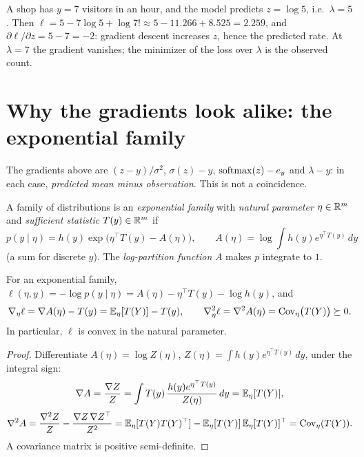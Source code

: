 \begin{notechapter}
\begin{example}\label{output-distributions:ex:poisson}
A shop has $y = 7$ visitors in an hour, and the model predicts $z = \log5$, i.e.\
$\lambda = 5$. Then $\ell = 5 - 7\log5 + \log7!\approx5 - 11.266 + 8.525 = 2.259$, and
$\partial\ell/\partial z = 5 - 7 = -2$: gradient descent increases $z$, hence the predicted rate. At
$\lambda = 7$ the gradient vanishes; the minimizer of the loss over $\lambda$ is the observed
count.
\end{example}

\section{Why the gradients look alike: the exponential family}\label{output-distributions:sec:expfam}

The gradients above are $(z - y)/\sigma^2$, $\sigma(z) - y$, $\operatorname{softmax}(z) - e_y$ and $\lambda - y$: in
each case, \emph{predicted mean minus observation}. This is not a coincidence.

\begin{definition}\label{output-distributions:def:expfam}
A family of distributions is an \emph{exponential family} with \emph{natural
parameter} $\eta\in\mathbb{R}^m$ and \emph{sufficient statistic} $T(y)\in\mathbb{R}^m$ if
\[
  p(y\mid\eta) = h(y)\exp\bigl(\eta^\top T(y) - A(\eta)\bigr),\qquad
  A(\eta) = \log\int h(y)e^{\eta^\top T(y)}\,dy
\]
(a sum for discrete $y$). The \emph{log-partition function} $A$ makes $p$ integrate
to $1$.
\end{definition}

\begin{proposition}\label{output-distributions:prop:expfam}
For an exponential family, $\ell(\eta, y) = -\log p(y\mid\eta) = A(\eta) - \eta^\top T(y) - \log h(y)$, and
\[
  \nabla_\eta\ell = \nabla A(\eta) - T(y) = \mathbb{E}_\eta[T(Y)] - T(y),\qquad
  \nabla^2_\eta\ell = \nabla^2A(\eta) = \operatorname{Cov}_\eta\bigl(T(Y)\bigr)\succeq0 .
\]
In particular, $\ell$ is convex in the natural parameter.
\end{proposition}

\begin{proof}
Differentiate $A(\eta) = \log Z(\eta)$, $Z(\eta) = \int h(y)e^{\eta^\top T(y)}\,dy$, under the integral sign:
\[
  \nabla A = \frac{\nabla Z}{Z} = \int T(y)\,\frac{h(y)e^{\eta^\top T(y)}}{Z(\eta)}\,dy = \mathbb{E}_\eta[T(Y)],
\]
\[
  \nabla^2A = \frac{\nabla^2Z}Z - \frac{\nabla Z\,\nabla Z^\top}{Z^2} = \mathbb{E}_\eta[T(Y)T(Y)^\top] - \mathbb{E}_\eta[T(Y)]\,\mathbb{E}_\eta[T(Y)]^\top = \operatorname{Cov}_\eta(T(Y)).
\]
A covariance matrix is positive semi-definite.
\end{proof}


\end{notechapter}
